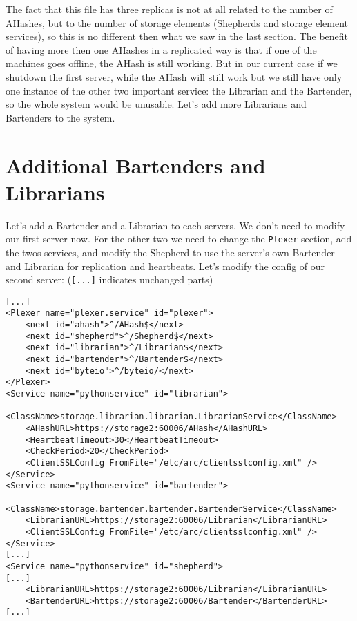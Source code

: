 \documentclass{book}
\begin{document}
The fact that this file has three replicas is not at all related to the number of AHashes, but to the number of storage elements (Shepherds and storage element services), so this is no different then what we saw in the last section. The benefit of having more then one AHashes in a replicated way is that if one of the machines goes offline, the AHash is still working. But in our current case if we shutdown the first server, while the AHash will still work but we still have only one instance of the other two important service: the Librarian and the Bartender, so the whole system would be unusable. Let's add more Librarians and Bartenders to the system.

\section{Additional Bartenders and Librarians} %
\label{sec:additional_bartenders_and_librarians}

Let's add a Bartender and a Librarian to each servers. We don't need to modify our first server now. For the other two we need to change the \verb!Plexer! section, add the twos services, and modify the Shepherd to use the server's own Bartender and Librarian for replication and heartbeats. Let's modify the config of our second server: (\verb![...]! indicates unchanged parts)

\begin{verbatim}
[...]
<Plexer name="plexer.service" id="plexer">
    <next id="ahash">^/AHash$</next>
    <next id="shepherd">^/Shepherd$</next>
    <next id="librarian">^/Librarian$</next>
    <next id="bartender">^/Bartender$</next>
    <next id="byteio">^/byteio/</next>
</Plexer>
<Service name="pythonservice" id="librarian">
    <ClassName>storage.librarian.librarian.LibrarianService</ClassName>
    <AHashURL>https://storage2:60006/AHash</AHashURL>
    <HeartbeatTimeout>30</HeartbeatTimeout>
    <CheckPeriod>20</CheckPeriod>
    <ClientSSLConfig FromFile="/etc/arc/clientsslconfig.xml" />
</Service>
<Service name="pythonservice" id="bartender">
    <ClassName>storage.bartender.bartender.BartenderService</ClassName>
    <LibrarianURL>https://storage2:60006/Librarian</LibrarianURL>
    <ClientSSLConfig FromFile="/etc/arc/clientsslconfig.xml" />
</Service>
[...]
<Service name="pythonservice" id="shepherd">
[...]
    <LibrarianURL>https://storage2:60006/Librarian</LibrarianURL>
    <BartenderURL>https://storage2:60006/Bartender</BartenderURL>
[...]
\end{verbatim}
\end{document}
